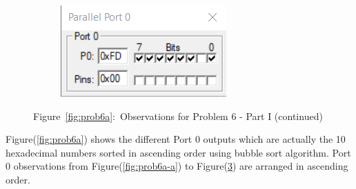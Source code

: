 \documentclass{lab_sheet}
\begin{document}
\begin{figure}[H]
\begin{subfigure}{.5\textwidth}
  \caption{}
  \label{fig:prob6a-i}
\end{subfigure}
\begin{subfigure}{.5\textwidth}
  \centering
  \includegraphics[frame,width=.8\linewidth]{../Figures/1_6_j.png}   
  \caption{}
  \label{fig:prob6a-j}
\end{subfigure}
\caption*{Figure~\ref{fig:prob6a}:~Observations for Problem 6 - Part I (continued)}
\end{figure}
Figure(\ref{fig:prob6a}) shows the different Port 0 outputs which are actually the 10 hexadecimal numbers sorted in ascending order using bubble sort algorithm. Port 0 observations from Figure(\ref{fig:prob6a-a}) to Figure(\ref{fig:prob6a-j}) are arranged in ascending order. 
\end{document}
